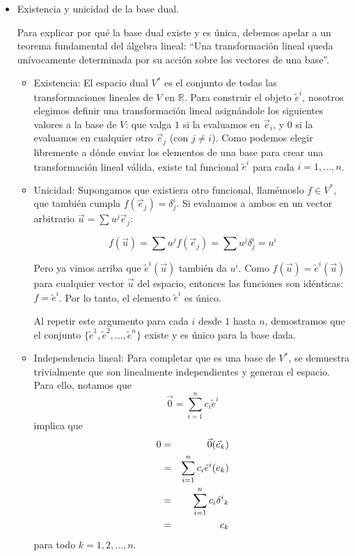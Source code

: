 \documentclass[11pt,spanish]{article}
\begin{document}
\begin{itemize}
$$\vec{\omega}(\vec{e}_j) = \omega_j$$


¡Demostrado! Esto nos dice que las componentes de un vector/covector son simplemente el resultado de ``medirlo'' con los elementos de la base complementaria.

\item Existencia y unicidad de la base dual.

Para explicar por qué la base dual existe y es única, debemos apelar a un teorema fundamental del álgebra lineal: ``Una transformación lineal queda unívocamente determinada por su acción sobre los vectores de una base''.

\begin{itemize}
\item Existencia:
El espacio dual $V^*$ es el conjunto de todas las transformaciones lineales de $V$ en $\mathbb{R}$.
Para construir el objeto $\tilde{e}^i$, nosotros elegimos definir una transformación lineal asignándole los siguientes valores a la base de $V$: que valga $1$ si la evaluamos en $\vec{e}_i$, y $0$ si la evaluamos en cualquier otro $\vec{e}_j$ (con $j \neq i$).
Como podemos elegir libremente a dónde enviar los elementos de una base para crear una transformación lineal válida, existe tal funcional $\tilde{e}^i$ para cada $i = 1, \dots, n$.

\item Unicidad:
Supongamos que existiera otro funcional, llamémoslo $f \in V^*$, que también cumpla $f(\vec{e}_j) = \delta^i_j$.
Si evaluamos a ambos en un vector arbitrario $\vec{u} = \sum u^j \vec{e}_j$:

$$f(\vec{u}) = \sum u^j f(\vec{e}_j) = \sum u^j \delta^i_j = u^i$$

Pero ya vimos arriba que $\tilde{e}^i(\vec{u})$ también da $u^i$. Como $f(\vec{u}) = \tilde{e}^i(\vec{u})$ para cualquier vector $\vec{u}$ del espacio, entonces las funciones son idénticas: $f = \tilde{e}^i$.
Por lo tanto, el elemento $\tilde{e}^i$ es único.

Al repetir este argumento para cada $i$ desde $1$ hasta $n$, demostramos que el conjunto $\{\tilde{e}^1, \tilde{e}^2, \dots, \tilde{e}^n\}$ existe y es único para la base dada. 

\item Independencia lineal:
Para completar que es una base de $V^*$, se demuestra trivialmente que son linealmente independientes y generan el espacio.
Para ello, notamos que
$$
\vec{0}
=
\sum_{i=1}^n c_i\tilde{e}^i
$$
implica que
\begin{eqnarray}
0
&=&
\vec{0}(\vec{e}_k)
\notag
\\
&=&
\sum_{i=1}^n
c_i\tilde{e}^i(e_k)
\notag
\\
&=&
\sum_{i=1}^n
c_i\delta^i{}_k
\notag
\\
&=&
c_k
\notag
\end{eqnarray}
para todo $k=1,2,...,n$.
\end{itemize}
\end{itemize} 
\end{document}
